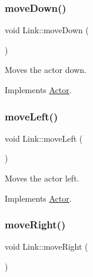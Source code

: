 \mbox{\label{classLink_a9ff8ec271a0119f6e1ee178afb47f323}} 
\subsubsection{\texorpdfstring{moveDown()}{moveDown()}}
{\footnotesize\ttfamily void Link\+::move\+Down (\begin{DoxyParamCaption}{ }\end{DoxyParamCaption})\hspace{0.3cm}{\ttfamily [virtual]}}



Moves the actor down. 



Implements \mbox{\hyperlink{classActor_ad2737cd62ea0c96f75853afb5d1fd83a}{Actor}}.

\mbox{\label{classLink_a682bab2dc3f967e35a67dcc74c1d4722}} 
\subsubsection{\texorpdfstring{moveLeft()}{moveLeft()}}
{\footnotesize\ttfamily void Link\+::move\+Left (\begin{DoxyParamCaption}{ }\end{DoxyParamCaption})\hspace{0.3cm}{\ttfamily [virtual]}}



Moves the actor left. 



Implements \mbox{\hyperlink{classActor_a522d6069bacaa9985db7a234bde2c8b6}{Actor}}.

\mbox{\label{classLink_aa1d60136a88be20a14179a5760ed91da}} 
\subsubsection{\texorpdfstring{moveRight()}{moveRight()}}
{\footnotesize\ttfamily void Link\+::move\+Right (\begin{DoxyParamCaption}{ }\end{DoxyParamCaption})\hspace{0.3cm}{\ttfamily [virtual]}}



